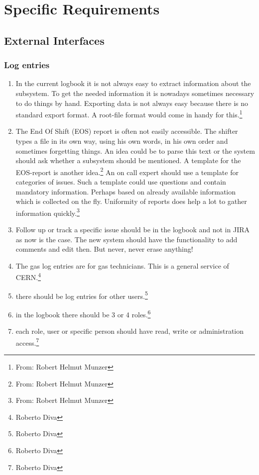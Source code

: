 
\chapter{Specific Requirements}
\section{External Interfaces}
\subsection{Log entries}
\begin{enumerate}
  \item In the current logbook it is not always easy to extract information about the subsystem. To get the needed information it is nowadays sometimes necessary to do things by hand. Exporting data is not always easy because there is no standard export format. A root-file format would come in handy for this.\footnote{From: Robert Helmut Munzer}
  \item The End Of Shift (EOS) report is often not easily accessible. The shifter types a file in its own way, using his own words, in his own order and sometimes forgetting things. An idea could be to parse this text or the system should ask whether a subsystem should be mentioned. A template for the EOS-report is another idea.\footnote{From: Robert Helmut Munzer}
  An on call expert should use a template for categories of issues. Such a template could use questions and contain mandatory information. Perhaps based on already available information which is collected on the fly. Uniformity of reports does help a lot to gather information quickly.\footnote{From: Robert Helmut Munzer}
  \item Follow up or track a specific issue should be in the logbook and not in JIRA as now is the case. The new system should have the functionality to add comments and edit then. But never, never erase anything! 
  \item The gas log entries are for gas technicians. This is a general service of CERN.\footnote{Roberto Diva}
    \item there should be log entries for other users.\footnote{Roberto Diva}
  \item in the logbook there should be 3 or 4 roles.\footnote{Roberto Diva}
  \item each role, user or specific person should have read, write or administration access.\footnote{Roberto Diva}
\end{enumerate}

